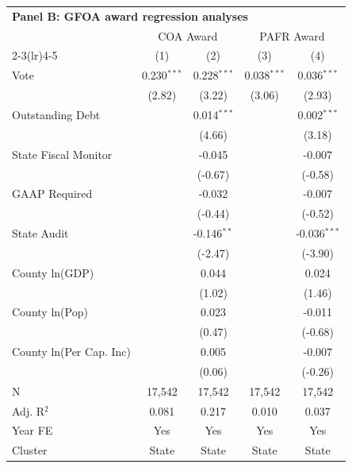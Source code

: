 \begingroup
\centering
\begin{tabular*}{\textwidth}{@{\extracolsep{\fill}}lcccc}
\multicolumn{5}{l}{\textbf{Panel B: GFOA award regression analyses}}\\
\addlinespace
   \toprule
    & \multicolumn{2}{c}{COA Award} & \multicolumn{2}{c}{PAFR Award}\\
   \cmidrule(lr){2-3}\cmidrule(lr){4-5}
                           & (1)           & (2)           & (3)           & (4)\\
   \midrule
   Vote                    & 0.230$^{***}$ & 0.228$^{***}$ & 0.038$^{***}$ & 0.036$^{***}$\\
                           & (2.82)       & (3.22)       & (3.06)       & (2.93)\\
   Outstanding Debt        &               & 0.014$^{***}$ &               & 0.002$^{***}$\\
                           &               & (4.66)       &               & (3.18)\\
   State Fiscal Monitor    &               & -0.045        &               & -0.007\\
                           &               & (-0.67)      &               & (-0.58)\\
   GAAP Required           &               & -0.032        &               & -0.007\\
                           &               & (-0.44)      &               & (-0.52)\\
   State Audit             &               & -0.146$^{**}$ &               & -0.036$^{***}$\\
                           &               & (-2.47)      &               & (-3.90)\\
   County ln(GDP)          &               & 0.044         &               & 0.024\\
                           &               & (1.02)       &               & (1.46)\\
   County ln(Pop)          &               & 0.023         &               & -0.011\\
                           &               & (0.47)       &               & (-0.68)\\
   County ln(Per Cap. Inc) &               & 0.005         &               & -0.007\\
                           &               & (0.06)       &               & (-0.26)\\
   \hline
   N            & 17,542        & 17,542        & 17,542        & 17,542\\
   Adj. R$^2$          & 0.081         & 0.217         & 0.010         & 0.037\\
   Year FE                 & Yes           & Yes           & Yes           & Yes\\
   Cluster              & State & State & State & State\\
   \bottomrule
\end{tabular*}
\par\endgroup
